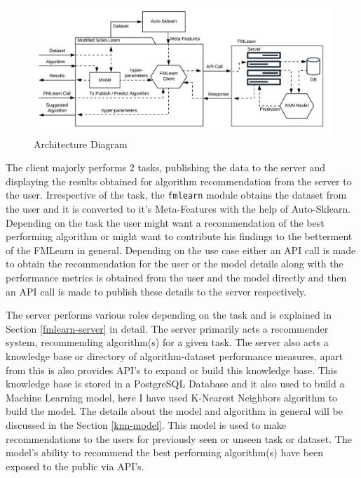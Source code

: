 \begin{figure}[t]
    \centering
    \includegraphics[width=15cm]{images/FML Architecture Diagram.jpeg}
    \caption{Architecture Diagram}
    \label{architecture-diagram}
\end{figure}

The client majorly performs 2 tasks, publishing the data to the server and displaying the results obtained for algorithm recommendation from the server to the user. Irrespective of the task, the \texttt{fmlearn} module obtains the dataset from the user and it is converted to it's Meta-Features with the help of Auto-Sklearn. Depending on the task the user might want a recommendation of the best performing algorithm or might want to contribute his findings to the betterment of the FMLearn in general. Depending on the use case either an API call is made to obtain the recommendation for the user or the model details along with the performance metrics is obtained from the user and the model directly and then an API call is made to publish these details to the server respectively.

The server performs various roles depending on the task and is explained in Section \ref{fmlearn-server} in detail. The server primarily acts a recommender system, recommending algorithm(s) for a given task. The server also acts a knowledge base or directory of algorithm-dataset performance measures, apart from this is also provides API's to expand or build this knowledge base. This knowledge base is stored in a PostgreSQL Database and it also used to build a Machine Learning model, here I have used K-Nearest Neighbors algorithm
to build the model. The details about the model and algorithm in general will be discussed in the Section \ref{knn-model}. This model is used to make recommendations to the users for previously seen or unseen task or dataset. The model's ability to recommend the best performing algorithm(s) have been exposed to the public via API's.


